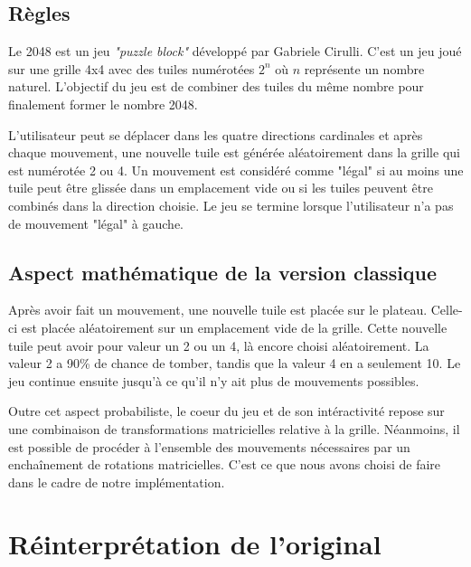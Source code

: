 \documentclass[a4paper, 12pt]{report}
\begin{document}
\section{Règles}

\tabto{1cm}Le 2048 est un jeu \textit{"puzzle block"} développé par Gabriele Cirulli. C'est un jeu joué sur
une grille 4x4 avec des tuiles numérotées ${2^{n}}$ où ${n}$ représente un nombre naturel. L'objectif
du jeu est de combiner des tuiles du même nombre pour finalement former le nombre 2048.

\vspace{0.5cm}

\tabto{1cm}L'utilisateur peut se déplacer dans les quatre directions cardinales et après chaque mouvement,
une nouvelle tuile est générée aléatoirement dans la grille qui est numérotée 2 ou 4. Un mouvement est
considéré comme "légal" si au moins une tuile peut être glissée dans un emplacement vide ou si les tuiles
peuvent être combinés dans la direction choisie. Le jeu se termine lorsque l'utilisateur n'a pas de mouvement
"légal" à gauche.

\section{Aspect mathématique de la version classique}

\tabto{1cm}Après avoir fait un mouvement, une nouvelle tuile est placée sur le plateau.
Celle-ci est placée aléatoirement sur un emplacement vide de la grille. Cette nouvelle tuile
peut avoir pour valeur un 2 ou un 4, là encore choisi aléatoirement. La valeur 2 a 90\% de chance
de tomber, tandis que la valeur 4 en a seulement 10. Le jeu continue ensuite jusqu'à ce qu'il n'y
ait plus de mouvements possibles.

\vspace{0.5cm}

\tabto{1cm}Outre cet aspect probabiliste, le coeur du jeu et de son intéractivité repose sur une
combinaison de transformations matricielles relative à la grille. Néanmoins, il est possible de
procéder à l'ensemble des mouvements nécessaires par un enchaînement de rotations matricielles.
C'est ce que nous avons choisi de faire dans le cadre de notre implémentation.

\chapter{Réinterprétation de l'original}
\end{document}
